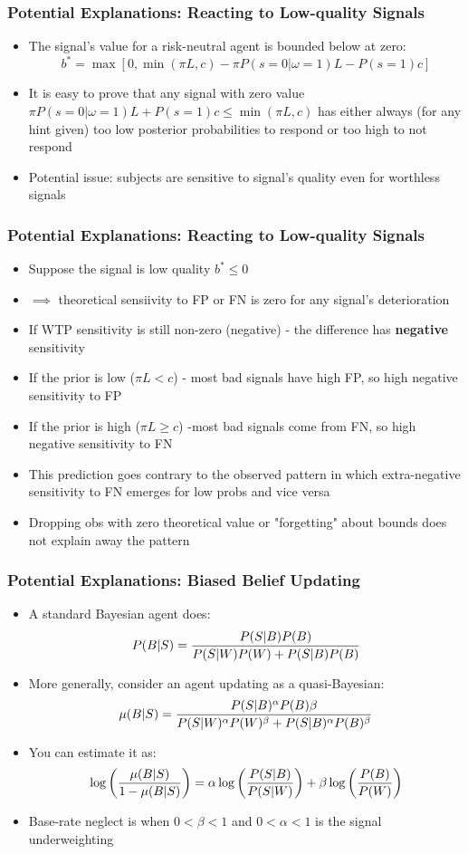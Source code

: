 \documentclass[11pt,hyperref={bookmarks=false}]{beamer}
\begin{document}
\begin{frame}
\frametitle{Potential Explanations: Reacting to Low-quality Signals}
\begin{itemize}
\item The signal's value for a risk-neutral agent is bounded below at zero: 
$$b^*=\max[0,\min(\pi L, c)-\pi P(s=0|\omega=1)L-P(s=1)c]$$
\item It is easy to prove that any signal with zero value $\pi P(s=0|\omega=1)L+P(s=1)c\leq \min(\pi L, c)$ has either always (for any hint given) too low posterior probabilities to respond or too high to not respond
\item Potential issue: subjects are sensitive to signal's quality even for worthless signals
\end{itemize}
\end{frame}


\begin{frame}
\frametitle{Potential Explanations: Reacting to Low-quality Signals}
\begin{itemize}
\item Suppose the signal is low quality $b^*\leq 0$
\item $\implies$ theoretical sensiivity to FP or FN is zero for any signal's deterioration
\item If WTP sensitivity is still non-zero (negative) - the difference has \textbf{negative} sensitivity
\item If the prior is low ($\pi L<c$) - most bad signals have high FP, so high negative sensitivity to FP
\item If the prior is high ($\pi L\geq c$) -most bad signals come from FN, so high negative sensitivity to FN
\item This prediction goes contrary to the observed pattern in which extra-negative sensitivity to FN emerges for low probs and vice versa 
\item Dropping obs with zero theoretical value or "forgetting" about bounds does not explain away the pattern
\end{itemize}
\end{frame}



\begin{frame}
\frametitle{Potential Explanations: Biased Belief Updating}
\begin{itemize}
\item A standard Bayesian agent does:
$$P(B|S)={P(S|B)P(B)\over P(S|W)P(W)+P(S|B)P(B)}$$
\item More generally, consider an agent updating as a quasi-Bayesian:
$$\mu(B|S)={P(S|B)^{\alpha}P(B){\beta}\over P(S|W)^{\alpha} P(W)^{\beta}+P(S|B)^{\alpha}P(B)^{\beta}} $$
\item You can estimate it as:
$$\log\left({\mu(B|S) \over 1-\mu(B|S)}\right)=\alpha \log\left({P(S|B) \over P(S|W)}\right)+\beta \log \left({P(B)\over P(W)}\right)$$
\item Base-rate neglect is when $0<\beta<1$ and $0<\alpha<1$ is the signal underweighting
\end{itemize}
\end{frame}
\end{document}
